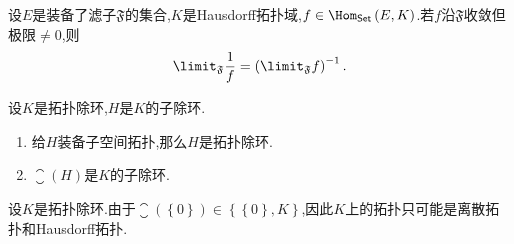 \begin{proposition}{}{}
	设$E$是装备了滤子$\mathfrak{F}$的集合,$K$是Hausdorff拓扑域,$f\in\Hom_{\mathsf{Set}}\left(E,K\right)$.若$f$沿$\mathfrak{F}$收敛但极限$\neq 0$,则
	\begin{align*}
		\limit_{\mathfrak{F}}\frac{1}{f}=\left(\limit_{\mathfrak{F}}f\right)^{-1}.
	\end{align*}
\end{proposition}

\begin{proposition}{}{}
	设$K$是拓扑除环,$H$是$K$的子除环.
	\begin{enumerate}
		\item 给$H$装备子空间拓扑,那么$H$是拓扑除环.
		\item $\closure\left(H\right)$是$K$的子除环.
	\end{enumerate}
\end{proposition}

\begin{remark}{}{}
	设$K$是拓扑除环.由于$\closure\left(\left\{0\right\}\right)\in\left\{\left\{0\right\},K\right\}$,因此$K$上的拓扑只可能是离散拓扑和Hausdorff拓扑.
\end{remark}





















